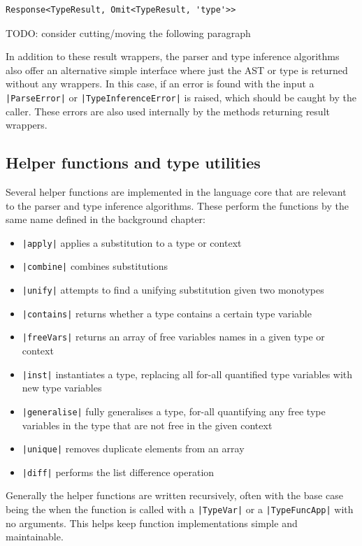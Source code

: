 \documentclass[a4paper,fleqn,oneside,12pt]{report}
\begin{document}
\begin{verbatim}
Response<TypeResult, Omit<TypeResult, 'type'>>
\end{verbatim}

TODO: consider cutting/moving the following paragraph

In addition to these result wrappers, the parser and type inference algorithms also offer an alternative simple interface where just the AST or type is returned without any wrappers. In this case, if an error is found with the input a \texttt{|ParseError|} or \texttt{|TypeInferenceError|} is raised, which should be caught by the caller. These errors are also used internally by the methods returning result wrappers.
\subsection{Helper functions and type utilities}\label{id:h.sw77qek8b49p}
Several helper functions are implemented in the language core that are relevant to the parser and type inference algorithms. These perform the functions by the same name defined in the background chapter:
\begin{itemize}
  \item \texttt{|apply|} applies a substitution to a type or context
  \item \texttt{|combine|} combines substitutions
  \item \texttt{|unify|} attempts to find a unifying substitution given two monotypes
  \item \texttt{|contains|} returns whether a type contains a certain type variable
  \item \texttt{|freeVars|} returns an array of free variables names in a given type or context
  \item \texttt{|inst|} instantiates a type, replacing all for-all quantified type variables with new type variables
  \item \texttt{|generalise|} fully generalises a type, for-all quantifying any free type variables in the type that are not free in the given context
  \item \texttt{|unique|} removes duplicate elements from an array
  \item \texttt{|diff|} performs the list difference operation
\end{itemize}

Generally the helper functions are written recursively, often with the base case being the when the function is called with a \texttt{|TypeVar|} or a \texttt{|TypeFuncApp|} with no arguments. This helps keep function implementations simple and maintainable.
\end{document}
